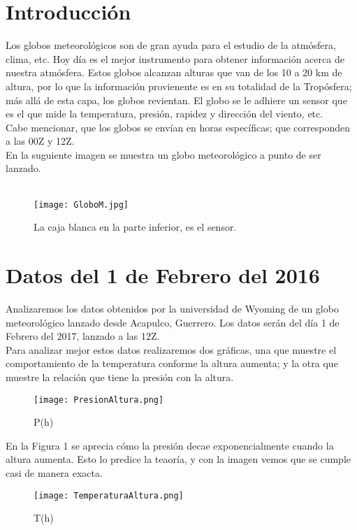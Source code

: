 \documentclass[a4paper]{article}
\begin{document}
\section*{Introducción}
Los globos meteorológicos son de gran ayuda para el estudio de la atmósfera, clima, etc. Hoy día es el mejor instrumento para obtener información acerca de nuestra atmósfera. Estos globos alcanzan alturas que van de los 10 a 20 km de altura, por lo que la información provienente es en su totalidad de la Tropósfera; más allá de esta capa, los globos revientan. El globo se le adhiere un sensor que es el que mide la temperatura, presión, rapidez y dirección del viento, etc.\\
Cabe mencionar, que los globos se envían en horas específicas; que corresponden a las 00Z y 12Z. \\
En la suguiente imagen se muestra un globo meteorológico a punto de ser lanzado. \\ \\
\begin{figure}[h]
\begin{center}
\texttt{[image: GloboM.jpg]}
\end{center}
\caption{La caja blanca en la parte inferior, es el sensor.}
\end{figure}

\newpage
\section*{Datos del 1 de Febrero del 2016}
Analizaremos los datos obtenidos por la universidad de Wyoming de un globo meteorológico lanzado desde Acapulco, Guerrero. Los datos serán del día 1 de Febrero del 2017, lanzado a las 12Z. \\  
Para analizar mejor estos datos realizaremos dos gráficas, una que muestre el comportamiento de la temperatura conforme la altura aumenta; y la otra que muestre la relación que tiene la presión con la altura.  \

\begin{figure}[h]
\begin{center}
\texttt{[image: PresionAltura.png]}
\end{center}
\caption{P(h)}
\end{figure}

En la Figura 1 se aprecia cómo la presión decae exponencialmente cuando la altura aumenta. Esto lo predice la teaoría, y con la imagen vemos que se cumple casi de manera exacta. \\
\begin{figure}[h]
\begin{center}
\texttt{[image: TemperaturaAltura.png]}
\end{center}
\caption{T(h)}
\end{figure}
\end{document}
